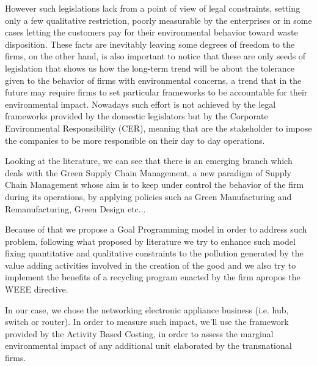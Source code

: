\documentclass{article}
\begin{document}
  However such legislations lack from a point of view of legal constraints, setting only a few qualitative restriction, poorly measurable by the enterprises or in some cases letting the customers pay for their environmental behavior toward waste disposition. These facts are inevitably leaving some degrees of freedom to the firms, on the other hand, is also important to notice that these are only seeds of legislation that shows us how the long-term trend will be about the tolerance given to the behavior of firms with environmental concerns, a trend that in the future may require firms to set particular frameworks to be accountable for their environmental impact. Nowadays such effort is not achieved by the legal frameworks provided by the domestic legislators but by the Corporate Environmental Responsibility (CER), meaning that are the stakeholder to impose the companies to be more responsible on their day to day operations.

  Looking at the literature, we can see that there is an emerging branch which deals with the Green Supply Chain Management, a new paradigm of Supply Chain Management whose aim is to keep under control the behavior of the firm during its operations, by applying policies such as Green Manufacturing and Remanufacturing, Green Design etc...

  Because of that we propose a Goal Programming model in order to address such problem, following what proposed by literature we try to enhance such model fixing quantitative and qualitative constraints to the pollution generated by the value adding activities involved in the creation of the good and we also try to implement the benefits of a recycling program enacted by the firm apropos the WEEE directive.

  In our case, we chose the networking electronic appliance business (i.e. hub, switch or router). In order to measure such impact, we'll use the framework provided by the Activity Based Costing, in order to assess the marginal environmental impact of any additional unit elaborated by the transnational firms.
\end{document}
